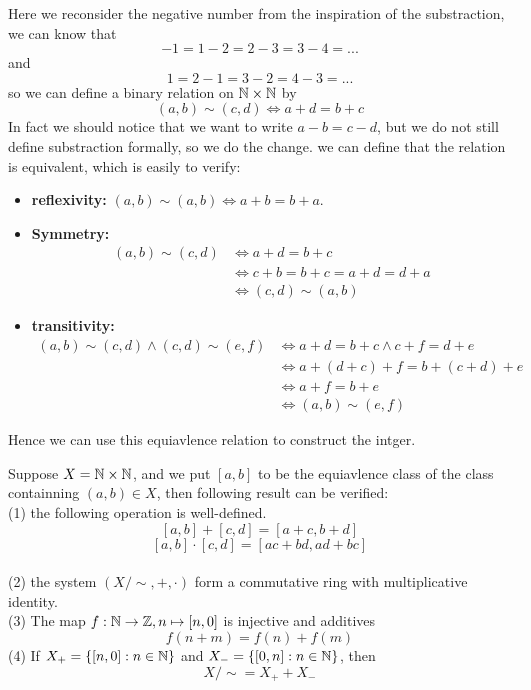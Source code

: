 \documentclass[en,geye,blue,pc,12pt]{elegantnote}
\begin{document}
Here we reconsider the negative number from the inspiration of the substraction, we can know that
\[-1 = 1-2 = 2-3 = 3-4 = ...\]
and 
\[1 = 2-1 = 3-2 = 4-3 = ...\]
so we can define a binary relation on \(\mathbb{N} \times \mathbb{N}\) by 
\[(a,b) \sim (c,d) \Longleftrightarrow a+d = b+c\]
In fact we should notice that we want to write \(a-b =c-d\), but we do not still define substraction formally, so we do the change. we can define that the relation is equivalent, which is easily to verify:
\begin{itemize}
    \item \textbf{reflexivity:} \((a,b) \sim (a,b) \Longleftrightarrow a+b = b+a\).
    \item \textbf{Symmetry:} \[
\begin{array}{rl}
  (a, b) \sim (c, d) & \iff a + d = b + c  \\
&\iff c+b = b+c = a+d = d+a \\ 
&\iff (c,d) \sim (a,b) \end{array}
\]
    \item \textbf{transitivity:}
    \[\begin{array}{rl}
        (a, b) \sim (c, d) \wedge (c,d) \sim (e,f) & \iff a + d = b + c \wedge c+f =d+e \\
      &\iff a+(d+c)+f = b+(c+d)+e\\ 
      &\iff a+f = b+e \\
      &\iff (a,b) \sim (e,f) \end{array}
      \]
\end{itemize}

Hence we can use this equiavlence relation to construct the intger.
\begin{proposition}
    Suppose \(X = \mathbb{N} \times \mathbb{N}\), and we put \([a,b]\) to be the equiavlence class of the class containning \((a,b) \in X\), then following result can be verified:
    \\(1) the following operation is well-defined.
    \[[a,b]+[c,d] = [a+c,b+d]\]
    \[[a,b]\cdot[c,d] = [ac+bd, ad+bc]\]
    \\(2) the system \((X/\sim,+,\cdot)\) form a commutative ring with multiplicative identity.
    \\(3) The map \(f: \mathbb{N} \to \mathbb{Z}, n \mapsto [n,0]\) is injective and additives   
    \begin{equation*}
      f(n+m) = f(n) + f(m)
    \end{equation*}
    (4) If \(X_+ = \{[n,0]: n\in \mathbb{N}\}\) and \(X_- = \{[0,n]: n\in \mathbb{N}\}\), then
    \[X/\sim = X_+ + X_-\]
\end{proposition}
\end{document}
